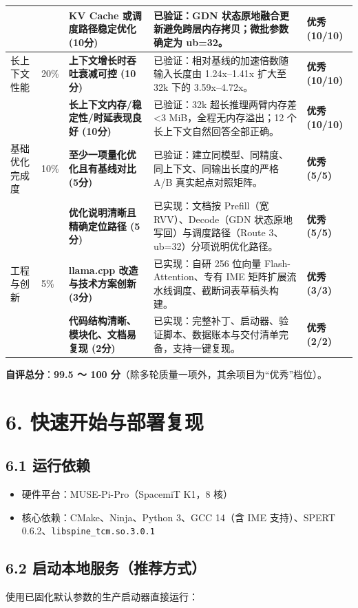 \documentclass[10pt,a4paper,fontset=none]{ctexart}
\begin{document}
\begin{scriptsize}
\begin{longtable}{@{}p{1.9cm}p{0.9cm}p{4.3cm}p{6.9cm}p{2.0cm}@{}}
 & & \textbf{KV Cache 或调度路径稳定优化 (10分)} & 已验证：GDN 状态原地融合更新避免跨层内存拷贝；微批参数确定为 ub=32。 & \textbf{优秀 (10/10)} \\
\midrule
长上下文性能 & 20\% & \textbf{上下文增长时吞吐衰减可控 (10分)} & 已验证：相对基线的加速倍数随输入长度由 1.24x--1.41x 扩大至 32k 下的 3.59x--4.72x。 & \textbf{优秀 (10/10)} \\
 & & \textbf{长上下文内存/稳定性/时延表现良好 (10分)} & 已验证：32k 超长推理两臂内存差 <3 MiB，全程无内存溢出；12 个长上下文自然回答全部正确。 & \textbf{优秀 (10/10)} \\
\midrule
基础优化完成度 & 10\% & \textbf{至少一项量化优化且有基线对比 (5分)} & 已验证：建立同模型、同精度、同上下文、同输出长度的严格 A/B 真实起点对照矩阵。 & \textbf{优秀 (5/5)} \\
 & & \textbf{优化说明清晰且精确定位路径 (5分)} & 已实现：文档按 Prefill（宽 RVV）、Decode（GDN 状态原地写回）与调度路径（Route 3、ub=32）分项说明优化路径。 & \textbf{优秀 (5/5)} \\
\midrule
工程与创新 & 5\% & \textbf{llama.cpp 改造与技术方案创新 (3分)} & 已实现：自研 256 位向量 Flash-Attention、专有 IME 矩阵扩展流水线调度、截断词表草稿头构建。 & \textbf{优秀 (3/3)} \\
 & & \textbf{代码结构清晰、模块化、文档易复现 (2分)} & 已实现：完整补丁、启动器、验证脚本、数据账本与交付清单完备，支持一键复现。 & \textbf{优秀 (2/2)} \\
\bottomrule
\end{longtable}
\end{scriptsize}

\textbf{自评总分}：\textbf{99.5 ～ 100 分}（除多轮质量一项外，其余项目为“优秀”档位）。

\section{6. 快速开始与部署复现}

\subsection{6.1 运行依赖}
\begin{itemize}
  \item 硬件平台：MUSE-Pi-Pro（SpacemiT K1，8 核）
  \item 核心依赖：CMake、Ninja、Python 3、GCC 14（含 IME 支持）、SPERT 0.6.2、\texttt{libspine\_tcm.so.3.0.1}
\end{itemize}

\subsection{6.2 启动本地服务（推荐方式）}
使用已固化默认参数的生产启动器直接运行：
\end{document}
